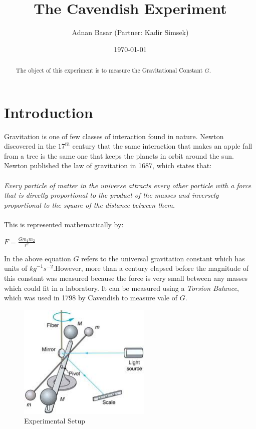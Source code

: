 \documentclass[aps,twocolumn,secnumarabic,nobalancelastpage,amsmath,amssymb,
nofootinbib]{revtex4}
\begin{document}
\title{The Cavendish Experiment}
\author         {Adnan Basar (Partner: Kadir Simsek)}
\date{\today}





\begin{abstract}
The object of this experiment is to measure the Gravitational Constant $G$.
\end{abstract}

\maketitle

\section{Introduction}

Gravitation is one of few classes of interaction found in nature. Newton discovered in the 
${17}^{th}$ century that the same interaction that makes an apple fall from a tree is the same one 
that keeps the planets in orbit around the sun. Newton published the law of gravitation in 
1687, which states that: 
 \emph{\\
 \\
 Every particle of matter in the universe attracts every other particle with a 
force that is directly proportional to the product of the masses and inversely 
proportional to the square of the distance between them.\\}
\\

This is represented mathematically by:
\begin{center}

$F=\frac{G{m}_{1}{m}_{2}}{{r}^{2}}$

\end{center}
In the above equation $G$ refers to the universal gravitation constant which has units of ${kg}^{-1}{s}^{-2}$.However, more than a century elapsed before the magnitude of this constant was measured because the force is very small between any masses which could fit in a 
laboratory. It can be measured using a \emph{Torsion Balance}, which was used in 1798 by 
Cavendish to measure vale of $G$.\\


\begin{figure}[htbp]
\includegraphics[width=2.5in]{setup.jpeg}
\caption{Experimental Setup}
\label{fig:schematic}
\end{figure}
\end{document}
